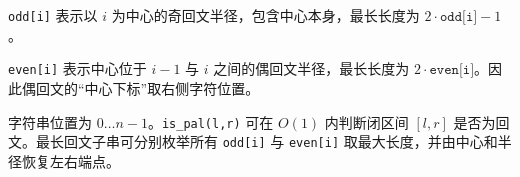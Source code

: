 \texttt{odd[i]} 表示以 $i$ 为中心的奇回文半径，包含中心本身，最长长度为 $2\cdot\texttt{odd[i]}-1$。

\texttt{even[i]} 表示中心位于 $i-1$ 与 $i$ 之间的偶回文半径，最长长度为 $2\cdot\texttt{even[i]}$。因此偶回文的“中心下标”取右侧字符位置。

字符串位置为 $0\ldots n-1$。\texttt{is\_pal(l,r)} 可在 $O(1)$ 内判断闭区间 $[l,r]$ 是否为回文。最长回文子串可分别枚举所有 \texttt{odd[i]} 与 \texttt{even[i]} 取最大长度，并由中心和半径恢复左右端点。
